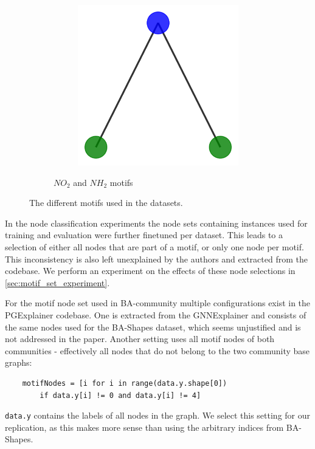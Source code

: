 \begin{figure}[h]
\begin{subfigure}[b]{0.30\textwidth}
\begin{subfigure}[b]{0.48\linewidth}
        \end{subfigure}
        \begin{subfigure}[b]{0.48\linewidth}
            \includegraphics[width=\linewidth]{img/Motif_Vis/MUTAG-MOTIF2.pdf}
        \end{subfigure}
        \caption{$NO_2$ and $NH_2$ motifs}
    \end{subfigure}
    
    \caption{The different motifs used in the datasets.}
    \label{fig:motifs}
\end{figure}

In the node classification experiments the node sets containing instances used for training and evaluation were further finetuned per dataset. This leads to a selection of either all nodes that are part of a motif, or only one node per motif. This inconsistency is also left unexplained by the authors and extracted from the codebase. We perform an experiment on the effects of these node selections in \ref{sec:motif_set_experiment}.

For the motif node set used in BA-community multiple configurations exist in the PGExplainer codebase. One is extracted from the GNNExplainer \cite{ying2019gnnexplainer} and consists of the same nodes used for the BA-Shapes dataset, which seems unjustified and is not addressed in the paper. Another setting uses all motif nodes of both communities - effectively all nodes that do not belong to the two community base graphs:
\begin{verbatim}
    motifNodes = [i for i in range(data.y.shape[0]) 
        if data.y[i] != 0 and data.y[i] != 4]
\end{verbatim}
\verb|data.y| contains the labels of all nodes in the graph.
We select this setting for our replication, as this makes more sense than using the arbitrary indices from BA-Shapes. \bigskip

